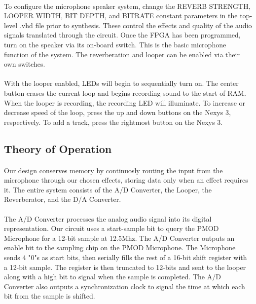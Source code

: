 \documentclass[12pt]{article}
\begin{document}
\paragraph{}
To configure the microphone speaker system, change the REVERB STRENGTH, LOOPER WIDTH, BIT DEPTH, and BITRATE constant parameters in the top-level .vhd file prior to synthesis. These control the effects and quality of the audio signals translated through the circuit. Once the FPGA has been programmed, turn on the speaker via its on-board switch. This is the basic microphone function of the system. The reverberation and looper can be enabled via their own switches. 

\paragraph{}
With the looper enabled, LEDs will begin to sequentially turn on. The center button erases the current loop and begins recording sound to the start of RAM. When the looper is recording, the recording LED will illuminate. To increase or decrease speed of the loop, press the up and down buttons on the Nexys 3, respectively. To add a track, press the rightmost button on the Nexys 3. 

\subsection{Theory of Operation}
\paragraph{}
Our design conserves memory by continuosly routing the input from the microphone through our chosen effects, storing data only when an effect requires it. The entire system consists of the A/D Converter, the Looper, the Reverberator, and the D/A Converter. 

\paragraph{}
The A/D Converter processes the analog audio signal into its digital representation. Our circuit uses a start-sample bit to query the PMOD Microphone for a 12-bit sample at 12.5Mhz. The A/D Converter outputs an enable bit to the sampling chip on the PMOD Microphone. The Microphone sends 4 "0"s as start bits, then serially fills the rest of a 16-bit shift register with a 12-bit sample. The register is then truncated to 12-bits and sent to the looper along with a high bit to signal when the sample is completed. The A/D Converter also outputs a synchronization clock to signal the time at which each bit from the sample is shifted. 
\end{document}
